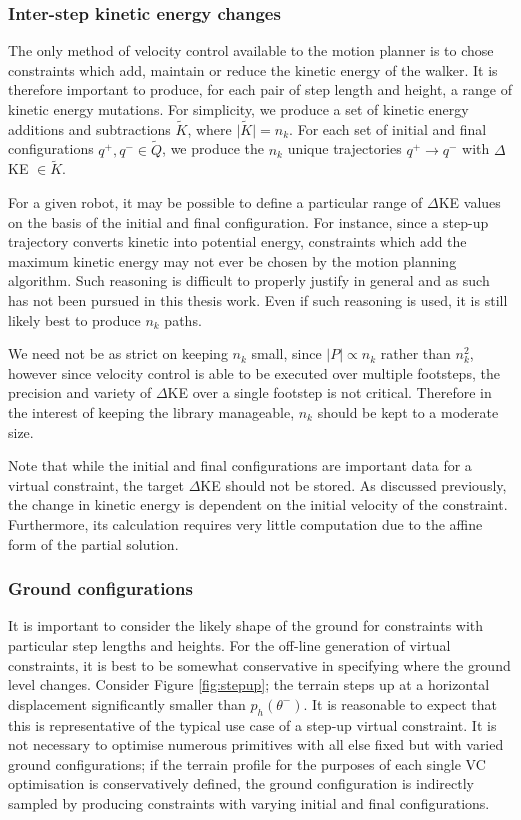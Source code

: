\subsubsection{Inter-step kinetic energy changes}
The only method of velocity control available to the motion planner is to chose constraints which add, maintain or reduce the kinetic energy of the walker. It is therefore important to produce, for each pair of step length and height, a range of kinetic energy mutations. For simplicity, we produce a set of kinetic energy additions and subtractions $\tilde{K}$, where $\lvert\tilde{K}\rvert = n_k$. For each set of initial and final configurations $q^+,q^- \in \tilde{Q}$, we produce the $n_k$ unique trajectories $q^+ \to q^-$ with $\Delta$KE $\in \tilde{K}$.

For a given robot, it may be possible to define a particular range of $\Delta$KE values on the basis of the initial and final configuration. For instance, since a step-up trajectory converts kinetic into potential energy, constraints which add the maximum kinetic energy may not ever be chosen by the motion planning algorithm. Such reasoning is difficult to properly justify in general and as such has not been pursued in this thesis work. Even if such reasoning is used, it is still likely best to produce $n_k$ paths.

We need not be as strict on keeping $n_k$ small, since $\lvert P \rvert \propto n_k$ rather than $n_k^2$, however since velocity control is able to be executed over multiple footsteps, the precision and variety of $\Delta$KE over a single footstep is not critical. Therefore in the interest of keeping the library manageable, $n_k$ should be kept to a moderate size.

Note that while the initial and final configurations are important data for a virtual constraint, the target $\Delta$KE should not be stored. As discussed previously, the change in kinetic energy is dependent on the initial velocity of the constraint. Furthermore, its calculation requires very little computation due to the affine form of the partial solution.

\subsubsection{Ground configurations}
It is important to consider the likely shape of the ground for constraints with particular step lengths and heights. For the off-line generation of virtual constraints, it is best to be somewhat conservative in specifying where the ground level changes. Consider Figure \ref{fig:stepup}; the terrain steps up at a horizontal displacement significantly smaller than $p_h(\theta^-)$. It is reasonable to expect that this is representative of the typical use case of a step-up virtual constraint. It is not necessary to optimise numerous primitives with all else fixed but with varied ground configurations; if the terrain profile for the purposes of each single VC optimisation is conservatively defined, the ground configuration is indirectly sampled by producing constraints with varying initial and final configurations.

